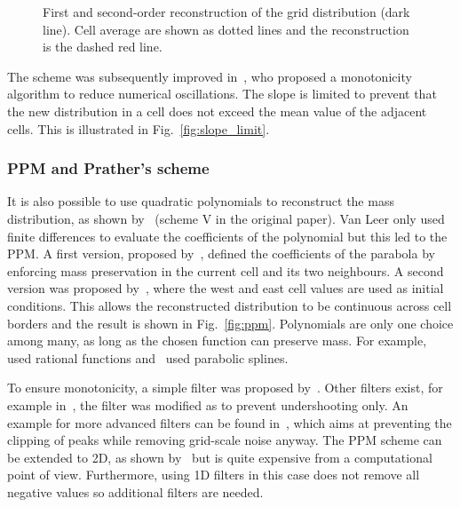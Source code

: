 \begin{figure}
  \hfill
  \caption{First and second-order reconstruction of the grid distribution (dark
    line). Cell average are shown as dotted lines and the reconstruction is the
  dashed red line.}
\end{figure}

The scheme was subsequently improved in~\cite{Leer1979}, who proposed a
monotonicity algorithm to reduce numerical oscillations. The slope is limited to
prevent that the new distribution in a cell does not exceed the mean value of the
adjacent cells. This is illustrated in Fig.~\ref{fig:slope_limit}.

\subsubsection{PPM and Prather's scheme}
It is also possible to use quadratic polynomials to reconstruct the mass
distribution, as shown by~\cite{Leer1977} (scheme V in the original paper). Van
Leer only used finite differences to evaluate the coefficients of the polynomial
but this led to the \gls{PPM}. A first version, proposed
by~\cite{Laprise1995}, defined the coefficients of the parabola by enforcing
mass preservation in the current cell and its two neighbours.  A second version
was proposed by~\cite{Colella1984}, where the west and east cell values are used
as initial conditions. This allows the reconstructed distribution to be
continuous across cell borders and the result is shown in
Fig.~\ref{fig:ppm}. Polynomials are only one choice among many, as long as the
chosen function can preserve mass. For example,~\cite{Xiao2002} used rational
functions and~\cite{Zerroukat2002} used parabolic splines.

To ensure monotonicity, a simple filter was proposed by~\cite{Colella1984}.
Other filters exist, for example in~\cite{Lin1996}, the filter was modified as
to prevent undershooting only. An example for more advanced filters can be found
in~\cite{Zerroukat2005}, which aims at preventing the clipping of peaks while
removing grid-scale noise anyway.  The PPM scheme can be extended to 2D, as
shown by~\cite{Rancic1992} but is quite expensive from a computational point of
view. Furthermore, using 1D filters in this case does not remove all negative
values so additional filters are needed.

